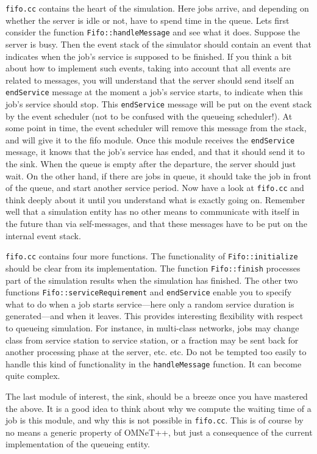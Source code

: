 \documentclass[a4paper]{article}
\begin{document}
\texttt{fifo.cc} contains the heart of the simulation. Here jobs
arrive, and depending on whether the server is idle or not, have to
spend time in the queue. Lets first consider the function
\texttt{Fifo::handleMessage} and see what it does. Suppose the server
is busy. Then the event stack of the simulator should contain an event
that indicates when the job's service is supposed to be finished.  If
you think a bit about how to implement such events, taking into
account that all events are related to messages, you will understand
that the server should send itself an \texttt{endService} message at
the moment a job's service starts, to indicate when this job's service
should stop.  This \texttt{endService} message will be put on the
event stack by the event scheduler (not to be confused with the
queueing scheduler!). At some point in time, the event scheduler will
remove this message from the stack, and will give it to
the fifo module.  Once this module receives the \texttt{endService}
message, it knows that the job's service has ended, and that it should
send it to the sink. When the queue is empty after the departure, the
server should just wait. On the other hand, if there are jobs in
queue, it should take the job in front of the queue, and start another
service period. Now have a look at \texttt{fifo.cc} and think deeply
about it until you understand what is exactly going on. Remember well
that a simulation entity has no other means to communicate with itself
in the future than via self-messages, and that these messages have to
be put on the internal event stack.

\texttt{fifo.cc} contains four more functions. The functionality of
\texttt{Fifo::initialize} should be clear from its implementation. The
function \texttt{Fifo::finish} processes part of the simulation
results when the simulation has finished.  The other two functions
\texttt{Fifo::serviceRequirement} and \texttt{endService} enable you
to specify what to do when a job starts service---here only a random
service duration is generated---and when it leaves. This provides
interesting flexibility with respect to queueing simulation. For
instance, in multi-class networks, jobs may change class from service
station to service station, or a fraction may be sent back for another
processing phase at the server, etc. etc. Do not be tempted too easily
to handle this kind of functionality in the \texttt{handleMessage}
function. It can become quite complex. 

The last module  of interest, the sink, should be a breeze once
you have mastered the above. It is a good idea to think about why we
compute the waiting time of a job is this module, and why this is not
possible in \texttt{fifo.cc}. This is of course by no means a generic
property of OMNeT++, but just a consequence of the current
implementation of the queueing entity.
\end{document}
